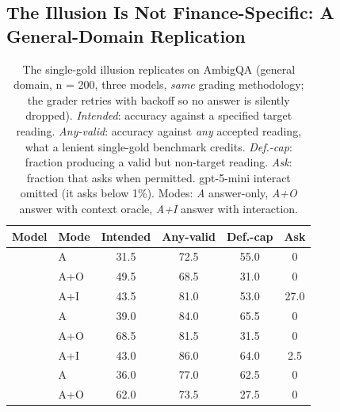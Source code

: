 \subsection{The Illusion Is Not Finance-Specific: A General-Domain Replication}
\label{sec:general}

\begin{table}[t]
\centering
\caption{The single-gold illusion replicates on AmbigQA (general domain,
n = 200, three models, \emph{same} grading methodology; the grader retries with
backoff so no answer is silently dropped). \emph{Intended}: accuracy against a
specified target reading. \emph{Any-valid}: accuracy against \emph{any} accepted
reading, what a lenient single-gold benchmark credits. \emph{Def.-cap}: fraction
producing a valid but non-target reading. \emph{Ask}: fraction that asks when
permitted. gpt-5-mini interact omitted (it asks below 1\%).
Modes: \emph{A} answer-only, \emph{A+O} answer with context oracle,
\emph{A+I} answer with interaction.}
\label{tab:general}
\small
\begin{tabular}{llcccc}
\toprule
Model & Mode & Intended & Any-valid & Def.-cap & Ask \\
\midrule
{}
 & A   & 31.5 & 72.5 & 55.0 & 0 \\
 & A+O & 49.5 & 68.5 & 31.0 & 0 \\
 & A+I & 43.5 & 81.0 & 53.0 & 27.0 \\
\midrule
{}
 & A   & 39.0 & 84.0 & 65.5 & 0 \\
 & A+O & 68.5 & 81.5 & 31.5 & 0 \\
 & A+I & 43.0 & 86.0 & 64.0 & 2.5 \\
\midrule
{}
 & A   & 36.0 & 77.0 & 62.5 & 0 \\
 & A+O & 62.0 & 73.5 & 27.5 & 0 \\
\bottomrule
\end{tabular}
\end{table}

